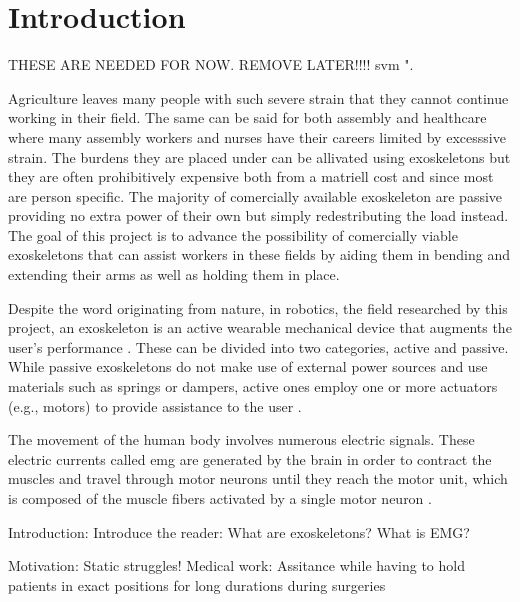 \section{Introduction}
\label{section:intro}


THESE ARE NEEDED FOR NOW. REMOVE LATER!!!! \cite{IEEEtran, IEEEtranformatexample, webpage, FundConDep, exampleofjournalarticle, exampleofconferencepaper}
\ac{svm} \cite{exampleofconferencepaper}".


Agriculture leaves many people with such severe strain that they cannot continue working in their field. The same can be said 
for both assembly and healthcare where many assembly workers and nurses have their careers limited by excesssive strain. The 
burdens they are placed under can be allivated using exoskeletons but they are often prohibitively expensive both from a 
matriell cost and since most are person specific. The majority of comercially available exoskeleton are passive providing no 
extra power of their own but simply redestributing the load instead. The goal of this project is to advance the possibility of 
comercially viable exoskeletons that can assist workers in these fields by aiding them in bending and extending their arms as 
well as holding them in place.

Despite the word originating from nature, in robotics, the field researched by this project, an exoskeleton is an active wearable 
mechanical device that augments the user's performance \cite{exodefinition}. These can be divided into two categories, active and passive. 
While passive exoskeletons do not make use of external power sources and use materials such as springs or dampers, active ones employ 
one or more actuators (e.g., motors) to provide assistance to the user \cite{passiveactiveexo}.

The movement of the human body involves numerous electric signals. These electric currents called \ac{emg} are generated by the brain
in order to contract the muscles and travel through motor neurons until they reach the motor unit, which is composed of the muscle fibers
activated by a single motor neuron \cite{EMGgen}. %

Introduction:
    Introduce the reader:
        What are exoskeletons?
        What is EMG?

    Motivation:
        Static struggles!
            Medical work:
                Assitance while having to hold patients in exact positions for long durations during surgeries


